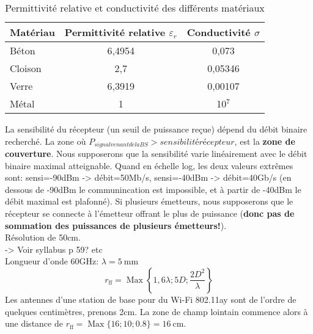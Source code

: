 \begin{table}[H]
\centering
\caption{Permittivité relative et conductivité des différents matériaux}
\label{tab:materials-properties}
\begin{tabular}{|l|c|c|}
    \hline
    Matériau & Permittivité relative $\varepsilon_r$ & Conductivité $\sigma$ \\
    \hline
    Béton & 6,4954  & 0,073  \\
    Cloison & 2,7  & 0,05346  \\
    Verre & 6,3919  & 0,00107  \\
    Métal & 1  & 10$^7$ \\
    \hline
\end{tabular}
\end{table}

La sensibilité du récepteur (un seuil de puissance reçue) dépend du débit binaire recherché. La zone où $P_{signal venant de la BS} > sensibilité récepteur$, est la \textbf{zone de couverture}. Nous supposerons que la sensibilité varie linéairement avec le débit binaire maximal atteignable. Quand en échelle log, les deux valeurs extrêmes sont: sensi=-90dBm -> débit=50Mb/s, sensi=-40dBm -> débit=40Gb/s (en dessous de -90dBm le communincation est impossible, et à partir de -40dBm le débit maximal est plafonné). Si plusieurs émetteurs, nous supposerons que le récepteur se connecte à l'émetteur offrant le plus de puissance (\textbf{donc pas de sommation des puissances de plusieurs émetteurs!}).\\

Résolution de 50cm.\\


-> Voir syllabus p 59? etc\\

Longueur d'onde 60GHz: $\lambda=5 \mathrm{~mm}$\\

$$
r_{\mathrm{ff}}=\operatorname{Max}\left\{1,6 \lambda ; 5 D ; \frac{2 D^2}{\lambda}\right\}
$$
Les antennes d'une station de base pour du Wi-Fi 802.11ay sont de l'ordre de quelques centimètres, prenons 2cm. La zone de champ lointain commence alors à une distance de $r_{\mathrm{ff}}= \operatorname{Max}\{16 ; 10 ; 0.8\} = 16\mathrm{~cm}$. 

